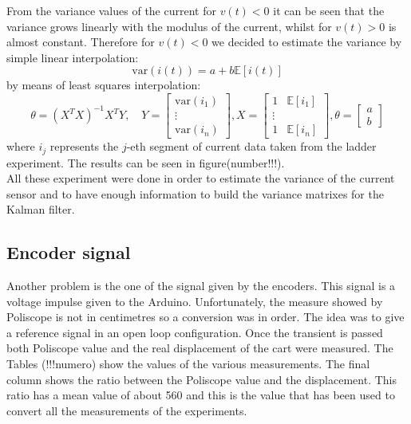 From the variance values of the current for $v(t)<0$ it can be seen that the variance grows linearly with the modulus of the current, whilst for $v(t)>0$ is almost constant. Therefore for $v(t)<0$ we decided to estimate the variance by simple linear interpolation:
\begin{equation}
\text{var}(i(t)) = a + b \mathbb{E}[i(t)]
\end{equation}
by means of least squares interpolation:
\begin{equation}
\theta = (X^T X)^{-1} X^T Y, \quad
Y  = \begin{bmatrix} \text{var}(i_1)\\ \vdots \\ \text{var}(i_n) \end{bmatrix},
X = \begin{bmatrix} 1 & \mathbb{E}[i_1]\\ \vdots \\ 1 & \mathbb{E}[i_n] \end{bmatrix},
\theta = \begin{bmatrix} a\\ b\end{bmatrix}
\end{equation}
where $i_j$ represents the $j$-eth segment of current data taken from the ladder experiment. The results can be seen in figure(number!!!).\\

All these experiment were done in order to estimate the variance of the current sensor and to have enough information to build the variance matrixes for the Kalman filter.

\subsection{Encoder signal}
Another problem is the one of the signal given by the encoders. This signal is a voltage impulse given to the Arduino. Unfortunately, the measure showed by Poliscope is not in centimetres so a conversion was in order. The idea was to give a reference signal in an open loop configuration. Once the transient is passed both Poliscope value and the real displacement of the cart were measured. The Tables (!!!numero) show the values of the various measurements. The final column shows the ratio between the Poliscope value and the displacement. This ratio has a mean value of about 560 and this is the value that has been used to convert all the measurements of the experiments.
